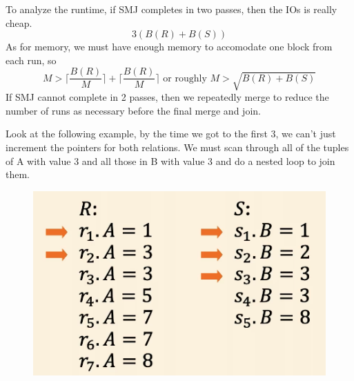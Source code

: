 \documentclass{article}
\begin{document}
\begin{definition}
      To analyze the runtime, if SMJ completes in two passes, then the IOs is really cheap. 
      \begin{equation}
        3 ( B(R) + B(S)) 
      \end{equation}
      As for memory, we must have enough memory to accomodate one block from each run, so 
      \begin{equation}
        M > \bigg\lceil \frac{B(R)}{M} \bigg\rceil + \bigg\lceil \frac{B(R)}{M} \bigg\rceil \text{ or roughly } M > \sqrt{B(R) + B(S)}
      \end{equation}
      If SMJ cannot complete in 2 passes, then we repeatedly merge to reduce the number of runs as necessary before the final merge and join. 
    \end{definition}

    \begin{example}
      Look at the following example, by the time we got to the first $3$, we can't just increment the pointers for both relations. We must scan through all of the tuples of A with value 3 and all those in B with value 3 and do a nested loop to join them. 
      
      \begin{figure}[H]
        \centering 
        \includegraphics[scale=0.4]{img/nested_loop.png}
        \caption{} 
        \label{fig:nested_loop}
      \end{figure}
    \end{example}
\end{document}
